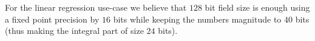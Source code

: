 





For the linear regression use-case we believe that $128$ bit field size is
enough using a fixed point precision by $16$ bits while keeping the numbers
magnitude to $40$ bits (thus making the integral part of size $24$ bits).


